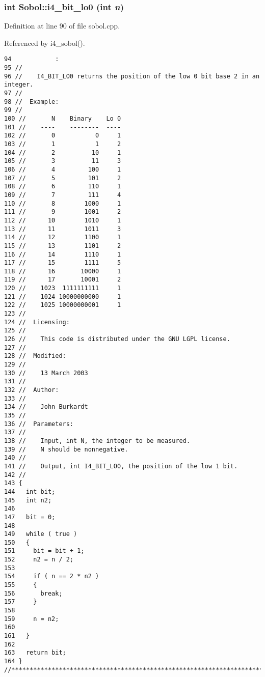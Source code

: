 \subsubsection{\setlength{\rightskip}{0pt plus 5cm}int Sobol::i4\_\-bit\_\-lo0 (int {\em n})}\label{namespaceSobol_22659c9df56bfdc7fa70da3216ed7d1e}




Definition at line 90 of file sobol.cpp.

Referenced by i4\_\-sobol().

\begin{Code}\begin{verbatim}94            :
95 //
96 //    I4_BIT_LO0 returns the position of the low 0 bit base 2 in an integer.
97 //
98 //  Example:
99 //
100 //       N    Binary    Lo 0
101 //    ----    --------  ----
102 //       0           0     1
103 //       1           1     2
104 //       2          10     1
105 //       3          11     3 
106 //       4         100     1
107 //       5         101     2
108 //       6         110     1
109 //       7         111     4
110 //       8        1000     1
111 //       9        1001     2
112 //      10        1010     1
113 //      11        1011     3
114 //      12        1100     1
115 //      13        1101     2
116 //      14        1110     1
117 //      15        1111     5
118 //      16       10000     1
119 //      17       10001     2
120 //    1023  1111111111     1
121 //    1024 10000000000     1
122 //    1025 10000000001     1
123 //
124 //  Licensing:
125 //
126 //    This code is distributed under the GNU LGPL license. 
127 //
128 //  Modified:
129 //
130 //    13 March 2003
131 //
132 //  Author:
133 //
134 //    John Burkardt
135 //
136 //  Parameters:
137 //
138 //    Input, int N, the integer to be measured.
139 //    N should be nonnegative.
140 //
141 //    Output, int I4_BIT_LO0, the position of the low 1 bit.
142 //
143 {
144   int bit;
145   int n2;
146 
147   bit = 0;
148 
149   while ( true )
150   {
151     bit = bit + 1;
152     n2 = n / 2;
153 
154     if ( n == 2 * n2 )
155     {
156       break;
157     }
158 
159     n = n2;
160 
161   }
162 
163   return bit;
164 }
//****************************************************************************80
\end{verbatim}
\end{Code}


